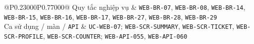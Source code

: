 \begin{longtable}{@{}P{0.23000\SRSWidth}P{0.77000\SRSWidth}@{}}
Quy tắc nghiệp vụ & \texttt{WEB-\allowbreak{}BR-\allowbreak{}07}, \texttt{WEB-\allowbreak{}BR-\allowbreak{}08}, \texttt{WEB-\allowbreak{}BR-\allowbreak{}14}, \texttt{WEB-\allowbreak{}BR-\allowbreak{}15}, \texttt{WEB-\allowbreak{}BR-\allowbreak{}16}, \texttt{WEB-\allowbreak{}BR-\allowbreak{}17}, \texttt{WEB-\allowbreak{}BR-\allowbreak{}27}, \texttt{WEB-\allowbreak{}BR-\allowbreak{}28}, \texttt{WEB-\allowbreak{}BR-\allowbreak{}29} \\[3pt]
Ca sử dụng /\allowbreak{} màn /\allowbreak{} \texttt{API} & \texttt{UC-\allowbreak{}WEB-\allowbreak{}07}; \texttt{WEB-\allowbreak{}SCR-\allowbreak{}SUMMARY}, \texttt{WEB-\allowbreak{}SCR-\allowbreak{}TICKET}, \texttt{WEB-\allowbreak{}SCR-\allowbreak{}PROFILE}, \texttt{WEB-\allowbreak{}SCR-\allowbreak{}COUNTER}; \texttt{WEB-\allowbreak{}API-\allowbreak{}055}, \texttt{WEB-\allowbreak{}API-\allowbreak{}060} \\[3pt]
\end{longtable}
\endgroup

